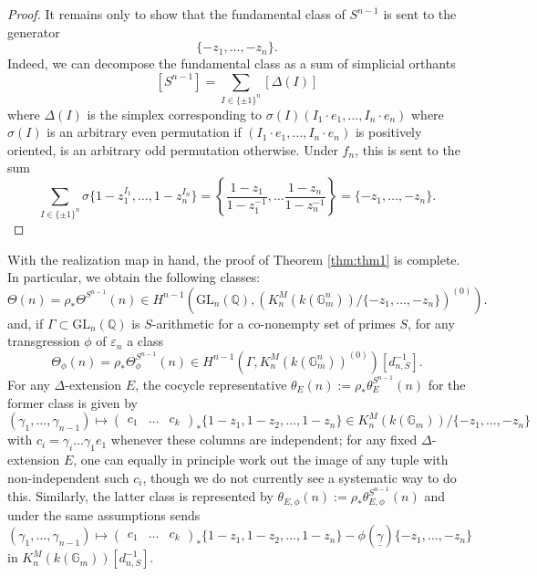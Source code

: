 \documentclass[10pt]{amsart}
\theoremstyle{definition}
\numberwithin{equation}{section}
\begin{document}
\begin{proof}
        It remains only to show that the fundamental class of $S^{n-1}$ is sent to the generator
        \[
        \{-z_1,\ldots, -z_n\}.
        \]
        Indeed, we can decompose the fundamental class as a sum of simplicial orthants 
        \[
        [S^{n-1}]=\sum_{I\in \{\pm 1\}^n} [\Delta(I)]
        \]
        where $\Delta(I)$ is the simplex corresponding to $\sigma(I) (I_1\cdot e_1,\ldots, I_n\cdot e_n)$ where $\sigma(I)$ is an arbitrary even permutation if $(I_1\cdot e_1,\ldots, I_n\cdot e_n)$ is positively oriented, is an arbitrary odd permutation otherwise. Under $f_n$, this is sent to the sum
        \[
        \sum_{I\in \{\pm 1\}^n} \sigma \{ 1-z_1^{I_1},\ldots, 1-z_n^{I_n}\} = \left\{ \frac{1-z_1}{1-z_1^{-1}} ,\ldots \frac{1-z_n}{1-z_n^{-1}} \right\} = \{ -z_1,\ldots, -z_n\}.
        \]
    \end{proof}
    With the realization map in hand, the proof of Theorem \ref{thm:thm1} is complete. In particular, we obtain the following classes: 
    \[
    \Theta(n) =  \rho_*\Theta^{S^{n-1}}(n) \in H^{n-1}(\mathrm{GL}_n(\mathbb{Q}), (K_n^M(k(\mathbb{G}_m^n))/\{-z_1,\ldots, -z_n\})^{(0)}).
    \]
    and, if $\Gamma\subset \mathrm{GL}_n(\mathbb{Q})$ is $S$-arithmetic for a co-nonempty set of primes $S$, for any transgression $\phi$ of $\varepsilon_n$ a class
    \[
    \Theta_\phi(n) =  \rho_*\Theta_\phi^{S^{n-1}}(n) \in H^{n-1}(\Gamma, K_n^M(k(\mathbb{G}_m^n))^{(0)})[d_{n,S}^{-1}].
    \]
    For any $\Delta$-extension $E$, the cocycle representative $\theta_E(n):=\rho_*\theta_E^{S^{n-1}}(n)$ for the former class is given by
    \[
    (\gamma_1,\ldots, \gamma_{n-1}) \mapsto \begin{pmatrix}c_1&\ldots & c_k\end{pmatrix}_* \{1-z_1,1-z_2,\ldots, 1-z_n\} \in  K_n^M(k(\mathbb{G}_m))/\{-z_1,\ldots, -z_n\}
    \]
    with $c_i=\gamma_i\ldots \gamma_1 e_1$ whenever these columns are independent; for any fixed $\Delta$-extension $E$, one can equally in principle work out the image of any tuple with non-independent such $c_i$, though we do not currently see a systematic way to do this. Similarly, the latter class is represented by $\theta_{E,\phi}(n):=\rho_*\theta_{E,\phi}^{S^{n-1}}(n)$ and under the same assumptions sends 
    \begin{equation} \label{eq:thecocycle}
    (\gamma_1,\ldots, \gamma_{n-1}) \mapsto \begin{pmatrix}c_1&\ldots & c_k\end{pmatrix}_* \{1-z_1,1-z_2,\ldots, 1-z_n\} - \phi(\underline{\gamma}) \{-z_1,\ldots, -z_n\}
    \end{equation}
    in $K_n^M(k(\mathbb{G}_m))[d_{n,S}^{-1}]$. 
    
\end{document}
